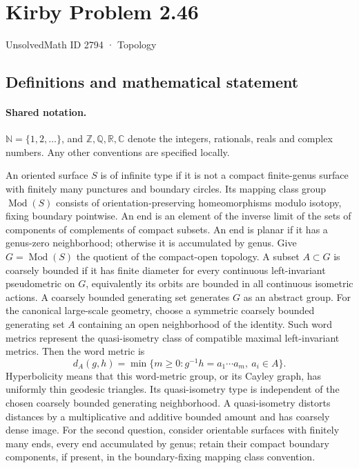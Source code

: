 \documentclass[11pt]{article}
\begin{document}
\setcounter{section}{2793}
\section{Kirby Problem 2.46}\label{2794}
{\small\sffamily UnsolvedMath ID 2794 · Topology}
\subsection{Definitions and mathematical statement}

\paragraph{Shared notation.}$\mathbb N=\{1,2,\ldots\}$, and $\mathbb Z,\mathbb Q,\mathbb R,\mathbb C$ denote the integers, rationals, reals and complex numbers. Any other conventions are specified locally.


An oriented surface $S$ is of infinite type if it is not a compact finite-genus surface with finitely many punctures and boundary circles. Its mapping class group $\operatorname{Mod}(S)$ consists of orientation-preserving homeomorphisms modulo isotopy, fixing boundary pointwise. An end is an element of the inverse limit of the sets of components of complements of compact subsets. An end is planar if it has a genus-zero neighborhood; otherwise it is accumulated by genus. Give $G=\operatorname{Mod}(S)$ the quotient of the compact-open topology. A subset $A\subset G$ is coarsely bounded if it has finite diameter for every continuous left-invariant pseudometric on $G$, equivalently its orbits are bounded in all continuous isometric actions. A coarsely bounded generating set generates $G$ as an abstract group. For the canonical large-scale geometry, choose a symmetric coarsely bounded generating set $A$ containing an open neighborhood of the identity. Such word metrics represent the quasi-isometry class of compatible maximal left-invariant metrics. Then the word metric is
\[d_A(g,h)=\min\{m\ge0:g^{-1}h=a_1\cdots a_m,\ a_i\in A\}.\]
Hyperbolicity means that this word-metric group, or its Cayley graph, has uniformly thin geodesic triangles. Its quasi-isometry type is independent of the chosen coarsely bounded generating neighborhood. A quasi-isometry distorts distances by a multiplicative and additive bounded amount and has coarsely dense image. For the second question, consider orientable surfaces with finitely many ends, every end accumulated by genus; retain their compact boundary components, if present, in the boundary-fixing mapping class convention.
\end{document}
